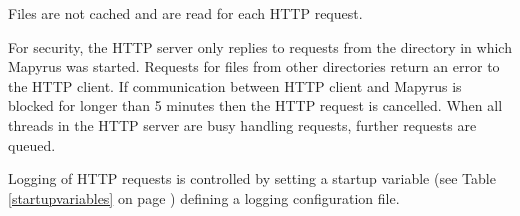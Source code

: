 Files are not cached and are read for each HTTP request.

For security, the HTTP server only replies to requests
from the directory in which Mapyrus was started.
Requests for files from other directories return an error to the HTTP client.
If communication between HTTP client and Mapyrus is blocked for longer than
5 minutes then the HTTP request is cancelled.
When all threads in the HTTP server are busy handling requests,
further requests are queued.

Logging of HTTP requests is controlled by setting a startup variable (see Table
\ref{startupvariables} on page \pageref{startupvariables}) defining a logging
configuration file.

